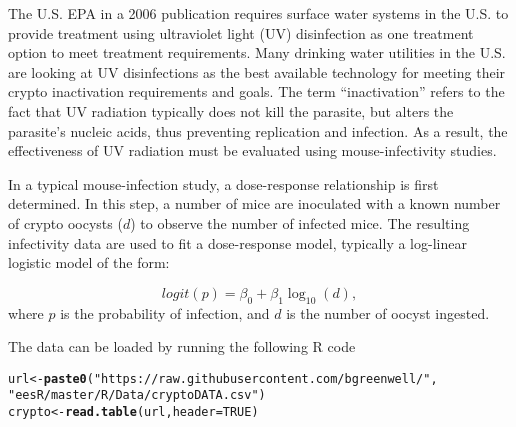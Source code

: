 \documentclass[12pt,a4paper]{article}\usepackage[]{graphicx}\usepackage[]{color}
\makeatletter
\newcommand{\hlnum}[1]{\textcolor[rgb]{0.686,0.059,0.569}{#1}}%
\newcommand{\hlstr}[1]{\textcolor[rgb]{0.192,0.494,0.8}{#1}}%
\newcommand{\hlstd}[1]{\textcolor[rgb]{0.345,0.345,0.345}{#1}}%
\newcommand{\hlkwb}[1]{\textcolor[rgb]{0.69,0.353,0.396}{#1}}%
\newcommand{\hlkwc}[1]{\textcolor[rgb]{0.333,0.667,0.333}{#1}}%
\newcommand{\hlkwd}[1]{\textcolor[rgb]{0.737,0.353,0.396}{\textbf{#1}}}%
\newenvironment{kframe}{%
 \def\at@end@of@kframe{}%
 \ifinner\ifhmode%
  \def\at@end@of@kframe{\end{minipage}}%
  \begin{minipage}{\columnwidth}%
 \fi\fi%
 \def\FrameCommand##1{\hskip\@totalleftmargin \hskip-\fboxsep
 \colorbox{shadecolor}{##1}\hskip-\fboxsep
     \hskip-\linewidth \hskip-\@totalleftmargin \hskip\columnwidth}%
 \MakeFramed {\advance\hsize-\width
   \@totalleftmargin\z@ \linewidth\hsize
   \@setminipage}}%
 {\par\unskip\endMakeFramed%
 \at@end@of@kframe}
\newenvironment{knitrout}{}{} %
\makeatother
\begin{document}
The U.S. EPA in a 2006 publication requires surface water systems in the U.S. to provide treatment using ultraviolet light (UV) disinfection as one treatment option to meet treatment requirements. Many drinking water utilities in the U.S. are looking at UV disinfections as the best available technology for meeting their crypto inactivation requirements and goals. The term ``inactivation'' refers to the fact that UV radiation typically does not kill the parasite, but alters the parasite's nucleic acids, thus preventing replication and infection. As a result, the effectiveness of UV radiation must be evaluated using mouse-infectivity studies.

In a typical mouse-infection study, a dose-response relationship is first determined. In this step, a number of mice are inoculated with a known number of crypto oocysts ($d$) to observe the number of infected mice. The resulting infectivity data are used to fit a dose-response model, typically a log-linear logistic model of the form:

\begin{equation}
  logit\left(p\right) = \beta_0 + \beta_1 \log_{10}\left(d\right),
\end{equation}
where $p$ is the probability of infection, and $d$ is the number of oocyst ingested.

The data can be loaded by running the following R code
\begin{knitrout}
\color{fgcolor}\begin{kframe}
\begin{alltt}
\hlstd{url} \hlkwb{<-} \hlkwd{paste0}\hlstd{(}\hlstr{"https://raw.githubusercontent.com/bgreenwell/"}\hlstd{,}
              \hlstr{"eesR/master/R/Data/cryptoDATA.csv"}\hlstd{)}
\hlstd{crypto} \hlkwb{<-} \hlkwd{read.table}\hlstd{(url,} \hlkwc{header} \hlstd{=} \hlnum{TRUE}\hlstd{)}
\end{alltt}
\end{kframe}
\end{knitrout}
\end{document}
